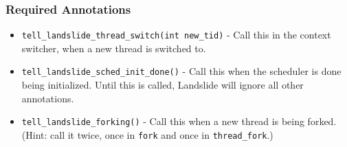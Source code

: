 \subsubsection{Required Annotations}
\begin{itemize}
	\small
	\item \texttt{tell\_landslide\_thread\_switch(int new\_tid)} - Call this in the context switcher, when a new thread is switched to.
	\item \texttt{tell\_landslide\_sched\_init\_done()} - Call this when the scheduler is done being initialized. Until this is called, Landslide will ignore all other annotations.
	\item \texttt{tell\_landslide\_forking()} - Call this when a new thread is being forked.
		(Hint: call it twice, once in \texttt{fork} and once in \texttt{thread\_fork}.)


\end{itemize}
